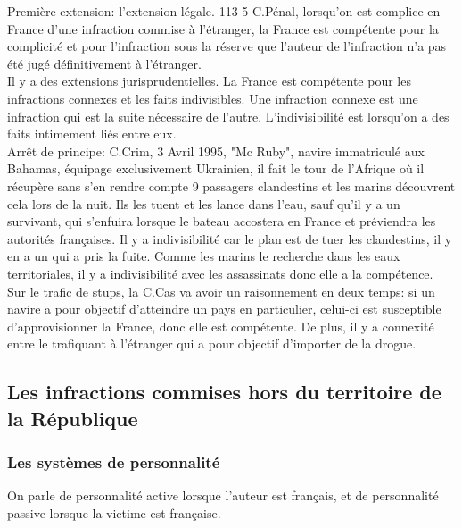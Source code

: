 \documentclass[10pt, a4paper, openany]{book}
\begin{document}
Première extension: l'extension légale. 113-5 C.Pénal, lorsqu'on est complice en France d'une infraction commise à l'étranger, la France est compétente pour la complicité et pour l'infraction sous la réserve que l'auteur de l'infraction n'a pas été jugé définitivement à l'étranger. \\
Il y a des extensions jurisprudentielles. La France est compétente pour les infractions connexes et les faits indivisibles. Une infraction connexe est une infraction qui est la suite nécessaire de l'autre. L'indivisibilité est lorsqu'on a des faits intimement liés entre eux. \\
Arrêt de principe: C.Crim, 3 Avril 1995, "Mc Ruby", navire immatriculé aux Bahamas, équipage exclusivement Ukrainien, il fait le tour de l'Afrique où il récupère sans s'en rendre compte 9 passagers clandestins et les marins découvrent cela lors de la nuit. Ils les tuent et les lance dans l'eau, sauf qu'il y a un survivant, qui s'enfuira lorsque le bateau accostera en France et préviendra les autorités françaises. Il y a indivisibilité car le plan est de tuer les clandestins, il y en a un qui a pris la fuite. Comme les marins le recherche dans les eaux territoriales, il y a indivisibilité avec les assassinats donc elle a la compétence. \\
Sur le trafic de stups, la C.Cas va avoir un raisonnement en deux temps: si un navire a pour objectif d'atteindre un pays en particulier, celui-ci est susceptible d'approvisionner la France, donc elle est compétente. De plus, il y a connexité entre le trafiquant à l'étranger qui a pour objectif d'importer de la drogue. 

\subsection{Les infractions commises hors du territoire de la République}

\subsubsection{Les systèmes de personnalité}

On parle de personnalité active lorsque l'auteur est français, et de personnalité passive lorsque la victime est française. 
\end{document}
